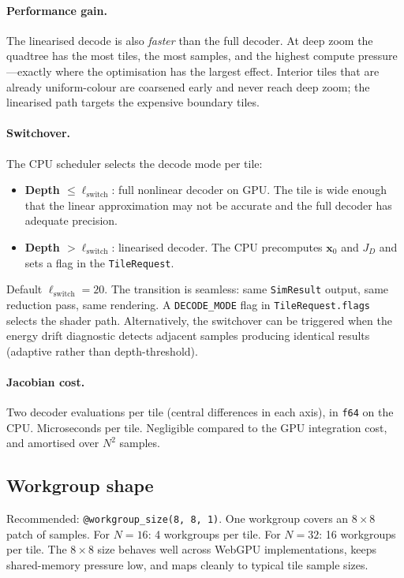 \documentclass[11pt]{report}
\begin{document}
\paragraph{Performance gain.} The linearised decode is also \emph{faster} than the full decoder. At deep zoom the quadtree has the most tiles, the most samples, and the highest compute pressure---exactly where the optimisation has the largest effect. Interior tiles that are already uniform-colour are coarsened early and never reach deep zoom; the linearised path targets the expensive boundary tiles.

\paragraph{Switchover.} The CPU scheduler selects the decode mode per tile:
\begin{itemize}[nosep]
\item \textbf{Depth $\le\ell_{\mathrm{switch}}$}: full nonlinear decoder on GPU. The tile is wide enough that the linear approximation may not be accurate and the full decoder has adequate precision.
\item \textbf{Depth $>\ell_{\mathrm{switch}}$}: linearised decoder. The CPU precomputes $\mathbf x_0$ and $J_D$ and sets a flag in the \texttt{TileRequest}.
\end{itemize}
Default $\ell_{\mathrm{switch}}=20$. The transition is seamless: same \texttt{SimResult} output, same reduction pass, same rendering. A \texttt{DECODE\_MODE} flag in \texttt{TileRequest.flags} selects the shader path. Alternatively, the switchover can be triggered when the energy drift diagnostic detects adjacent samples producing identical results (adaptive rather than depth-threshold).

\paragraph{Jacobian cost.} Two decoder evaluations per tile (central differences in each axis), in \texttt{f64} on the CPU. Microseconds per tile. Negligible compared to the GPU integration cost, and amortised over $N^2$ samples.

\subsection{Workgroup shape}

Recommended: \texttt{@workgroup\_size(8, 8, 1)}. One workgroup covers an $8\times 8$ patch of samples. For $N=16$: 4 workgroups per tile. For $N=32$: 16 workgroups per tile. The $8\times 8$ size behaves well across WebGPU implementations, keeps shared-memory pressure low, and maps cleanly to typical tile sample sizes.
\end{document}
